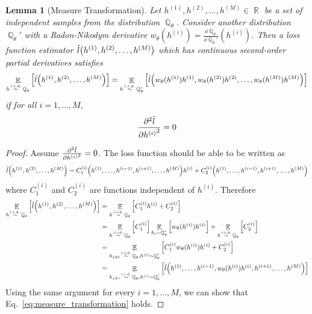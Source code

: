 \documentclass{article}
\theoremstyle{plain}
\newtheorem{lemma}[theorem]{Lemma}
\theoremstyle{definition}
\theoremstyle{remark}
\DeclareMathOperator{\R}{\mathbb{R}}
\DeclareMathOperator{\Q}{\mathbb{Q}}
\DeclareMathOperator{\E}{\mathbb{E}}
\DeclareMathOperator{\iid}{\overset{\mathrm{i.i.d.}}{\sim}}
\begin{document}
\begin{lemma}[Measure Transformation]\label{lem:measure_transformation}
    Let $h^{(1)}, h^{(2)}, \dots, h^{(M)} \in \R$ be a set of independent samples from the distribution $\Q_\theta$. Consider another distribution $\Q_\theta'$ with a Radon-Nikodym derivative $w_\theta(h^{(i)}) = \frac{\dd \Q_\theta}{\dd \Q_\theta'}(h^{(i)})$. Then a loss function estimator $\hat{l}\qty(h^{(1)}, h^{(2)}, \dots, h^{(M)})$ which has continuous second-order partial derivatives satisfies
    \begin{equation}
        \label{eq:measure_transformation}
        \E_{h\iid \Q_\theta}\qty[\hat{l}\qty(h^{(1)}, h^{(2)}, \dots, h^{(M)})] = \E_{h\iid \Q_\theta'}\qty[\hat{l}\qty(w_\theta(h^{(1)})h^{(1)}, w_\theta(h^{(2)})h^{(2)}, \dots, w_\theta(h^{(M)})h^{(M)})]
    \end{equation}
    if for all $i=1,\dots,M$,
    \begin{equation}
        \pdv[2]{\hat{l}}{{h^{(i)}}} = 0
    \end{equation}
\end{lemma}

\begin{proof}
    Assume $\pdv[2]{\hat{l}}{{h^{(i)}}} = 0$. The loss function should be able to be written as
    \begin{equation}
        \hat{l}\qty(h^{(1)}, h^{(2)}, \dots, h^{(M)}) = C_1^{(i)}\qty(h^{(1)}, \dots, h^{(i-1)}, h^{(i+1)}, \dots, h^{(M)}) h^{(i)} + C_2^{(i)}\qty(h^{(1)}, \dots, h^{(i-1)}, h^{(i+1)}, \dots, h^{(M)})
    \end{equation}
    where $C_1^{(i)}$ and $C_2^{(i)}$ are functions independent of $h^{(i)}$. Therefore
    \begin{equation}
        \begin{aligned}
            \E_{h\iid \Q_\theta}\qty[\hat{l}\qty(h^{(1)}, h^{(2)}, \dots, h^{(M)})] & = \E_{h\iid \Q_\theta}\qty[C_1^{(i)}h^{(i)} + C_2^{(i)}] \\
            & = \E_{h\iid \Q_\theta}\qty[C_1^{(i)}] \E_{h_i \sim \Q_\theta'}\qty[w_\theta(h^{(i)})h^{(i)}] + \E_{h\iid \Q_\theta}\qty[C_2^{(i)}] \\
            & = \E_{h_{j\neq i}\iid \Q_\theta, h^{(i)}\sim \Q_\theta'}\qty[C_1^{(i)}w_\theta(h^{(i)})h^{(i)} + C_2^{(i)}] \\
            & = \E_{h_{j\neq i}\iid \Q_\theta, h^{(i)}\sim \Q_\theta'}\qty[\hat{l}\qty(h^{(1)},\dots, h^{(i-1)}, w_\theta(h^{(i)})h^{(i)}, h^{(i+1)}, \dots, h^{(M)})] \\
        \end{aligned}
    \end{equation}
    Using the same argument for every $i=1,\dots,M$, we can show that Eq.~\eqref{eq:measure_transformation} holds.
\end{proof}
\end{document}
